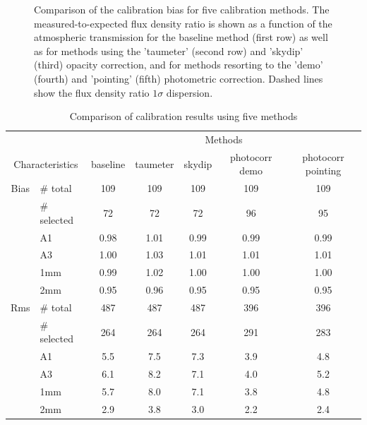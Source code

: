 \begin{figure}[ht!]
\begin{center}
    \caption[Calibration bias comparison]{Comparison of the
      calibration bias for five calibration methods. The measured-to-expected flux density ratio is shown as a
      function of the atmospheric transmission for the baseline method
      (first row) as well as for methods using the 'taumeter' (second
      row) and 'skydip' (third) opacity correction, and for methods
      resorting to the 'demo' (fourth) and 'pointing' (fifth)
      photometric correction. Dashed lines
      show the flux density ratio $1 \sigma $ dispersion.}
    \label{fig:mwc349_obstau_others}
  \end{center}
\end{figure}


\begin{table}[th]
\begin{center}
\begin{tabular}{|c|l|c|c|c|c|c|}
  \hline
  \multicolumn{2}{|c|}{}  &  \multicolumn{5}{|c|}{Methods} \\\cline{3-7}
  \multicolumn{2}{|c|}{Characteristics} &  baseline  & taumeter  &  skydip  &  photocorr demo & photocorr pointing \\
  \hline\hline
  Bias &  $\#$ total    &   109   &   109    &   109    &    109    &  109   \\
       &  $\#$ selected &    72   &   72     &    72    &     96    &   95   \\
       &  A1            &   0.98  &  1.01    &  0.99    &   0.99    &  0.99  \\
       &  A3            &   1.00  &  1.03    &  1.01    &   1.01    &  1.01  \\
       &  1mm           &   0.99  &  1.02    &  1.00    &   1.00    &  1.00  \\
       &  2mm           &   0.95  &  0.96    &  0.95    &   0.95    &  0.95  \\
  \hline
  Rms  &  $\#$ total    &   487    &    487   &    487    &    396    &  396 \\
       &  $\#$ selected &   264    &    264   &    264    &    291    &  283 \\
       &  A1            &   5.5    &    7.5   &    7.3    &    3.9    &  4.8 \\
       &  A3            &   6.1    &    8.2   &    7.1    &    4.0    &  5.2 \\
       &  1mm           &   5.7    &    8.0   &    7.1    &    3.8    &  4.8 \\
       &  2mm           &   2.9    &    3.8   &    3.0    &    2.2    &  2.4 \\
\hline\hline
\end{tabular}
\caption[Comparison of calibration results using five methods]{Comparison of calibration results using five methods}
\label{tab:Calibration_results_all}
\end{center}
\end{table}

